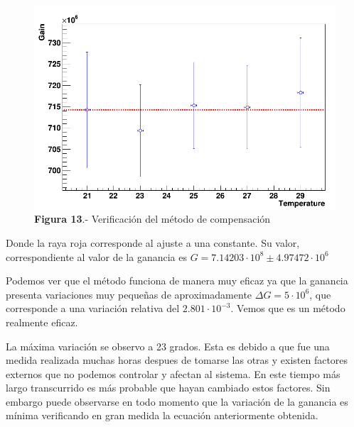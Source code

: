 \begin{figure}[hbtp]
\centering
\includegraphics[scale=0.4]{compensacion.png}
\caption{\textbf{Figura 13}.- Verificación del método de compensación}
\end{figure}

Donde la raya roja corresponde al ajuste a una constante. Su valor, correspondiente al valor de la ganancia es $G=7.14203 \cdot 10^8 \pm 4.97472 \cdot 10^6$

Podemos ver que el método funciona de manera muy eficaz ya que la ganancia presenta variaciones muy pequeñas de aproximadamente $\Delta G=5 \cdot 10^6$, que corresponde a una variación relativa del $2.801 \cdot 10^{-3} $. Vemos que es un método realmente eficaz.

La máxima variación se observo a 23 grados. Esta es debido a que fue una medida realizada muchas horas despues de tomarse las otras y existen factores externos que no podemos controlar y afectan al sistema. En este tiempo más largo transcurrido es más probable que hayan cambiado estos factores. Sin embargo puede observarse en todo momento que la variación de la ganancia es mínima verificando en gran medida la ecuación anteriormente obtenida.

\newpage
